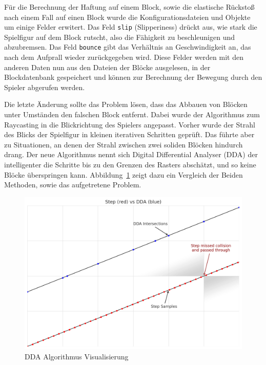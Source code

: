 \documentclass{article}
\begin{document}
Für die Berechnung der Haftung auf einem Block, sowie die elastische Rückstoß nach einem Fall auf einen Block wurde die Konfigurationsdateien und Objekte um einige Felder erwitert. Das Feld \texttt{slip} (Slipperiness) drückt aus, wie stark die Spielfigur auf dem Block rutscht, also die Fähigkeit zu beschleunigen und abzubremsen. Das Feld \texttt{bounce} gibt das Verhältnis an Geschwindigkeit an, das nach dem Aufprall wieder zurückgegeben wird. Diese Felder werden mit den anderen Daten nun aus den Dateien der Blöcke ausgelesen, in der Blockdatenbank gespeichert und können zur Berechnung der Bewegung durch den Spieler abgerufen werden.

Die letzte Änderung sollte das Problem lösen, dass das Abbauen von Blöcken unter Umständen den falschen Block entfernt. Dabei wurde der Algorithmus zum Raycasting in die Blickrichtung des Spielers angepasst. Vorher wurde der Strahl des Blicks der Spielfigur in kleinen iterativen Schritten geprüft. Das führte aber zu Situationen, an denen der Strahl zwischen zwei soliden Blöcken hindurch drang. Der neue Algorithmus nennt sich Digital Differential Analyser (DDA) der intelligenter die Schritte bis zu den Grenzen des Rasters abschätzt, und so keine Blöcke überspringen kann. Abbildung~\ref{pic:dda} zeigt dazu ein Vergleich der Beiden Methoden, sowie das aufgetretene Problem.

\begin{figure} [ht]
  \centering
  \includegraphics[width=1\linewidth]{dda.png}
  \caption{DDA Algorithmus Visualisierung}
  \label{pic:dda}
\end{figure}

\FloatBarrier
\end{document}
